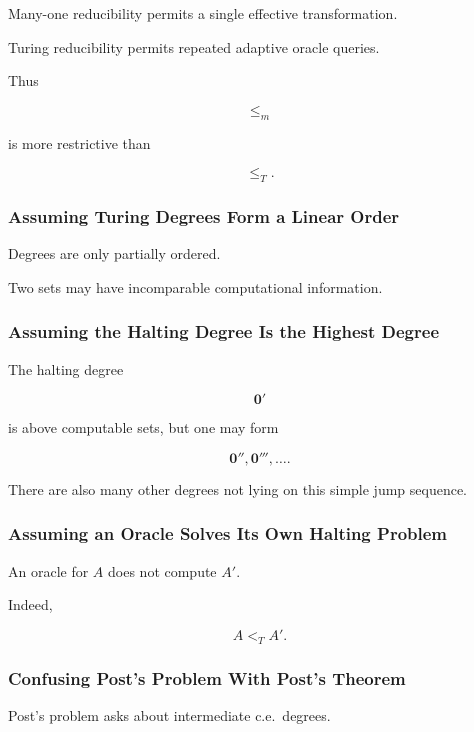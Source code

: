 Many-one reducibility permits a single effective transformation.

Turing reducibility permits repeated adaptive oracle queries.

Thus

\[
\boxed{
\leq_m
}
\]

is more restrictive than

\[
\boxed{
\leq_T.
}
\]

\subsubsection{Assuming Turing Degrees Form a Linear Order}

Degrees are only partially ordered.

Two sets may have incomparable computational information.

\subsubsection{Assuming the Halting Degree Is the Highest Degree}

The halting degree

\[
\mathbf{0}'
\]

is above computable sets, but one may form

\[
\boxed{
\mathbf{0}'',
\mathbf{0}''',
\ldots.
}
\]

There are also many other degrees not lying on this simple jump sequence.

\subsubsection{Assuming an Oracle Solves Its Own Halting Problem}

An oracle for \(A\) does not compute \(A'\).

Indeed,

\[
\boxed{
A<_TA'.
}
\]

\subsubsection{Confusing Post's Problem With Post's Theorem}

Post's problem asks about intermediate c.e.\ degrees.

